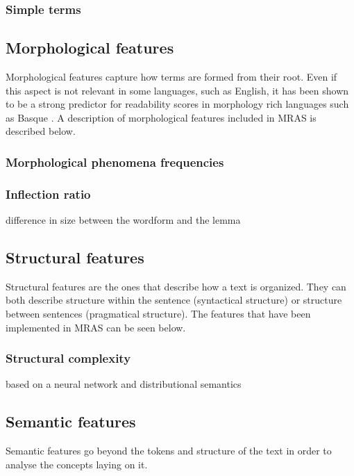 \documentclass{bsu-ms}
\newcommand{\projectName}{MRAS\xspace}
\begin{document}
\subsubsection*{Simple terms}







\subsection{Morphological features}
Morphological features capture how terms are formed from their root. Even if this  aspect is not relevant in some languages, such as English, it has been shown to be a strong predictor for readability scores in morphology rich languages such as Basque \cite{gonzalez2014simple}. A description of morphological features included in \projectName is described below.


\subsubsection*{Morphological phenomena frequencies}

\subsubsection*{Inflection ratio}
difference in size between the wordform and the lemma


\subsection{Structural features}
Structural features are the ones that describe how a text is organized. They can both describe structure within the sentence (syntactical structure) or structure between sentences (pragmatical structure). The features that have been implemented in \projectName can be seen below.


\subsubsection*{Structural complexity}
based on a neural network and distributional semantics

\subsection{Semantic features}
Semantic features go beyond the tokens and structure of the text in order to analyse the concepts laying on it.
\end{document}
